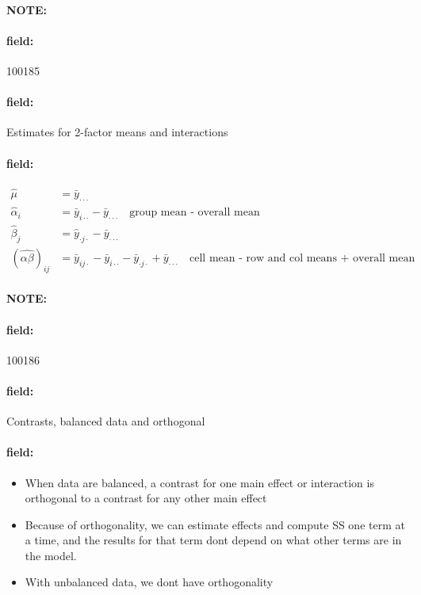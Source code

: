 \documentclass[12pt]{article}
\newenvironment{note}{\paragraph{NOTE:}}{}
\newenvironment{field}{\paragraph{field:}}{}
\begin{document}
\begin{note}
    \begin{field}
        \tiny 100185
    \end{field}
    \begin{field}
        Estimates for 2-factor means and interactions
    \end{field}
    \begin{field}
        \begin{align*}
          \hat{\mu} &= \bar{y}_{\cdot\cdot\cdot}\\
          \hat{\alpha}_i &= \bar{y}_{i\cdot\cdot} - \bar{y}_{\cdot\cdot\cdot} \quad \text{group mean - overall mean}\\
          \hat{\beta}_j &= \hat{y}_{\cdot j \cdot } - \bar{y}_{\cdot \cdot \cdot }\\
          (\hat{\alpha\beta})_{ij} &= \bar{y}_{ij\cdot} - \bar{y}_{i\cdot\cdot} - \bar{y}_{\cdot j \cdot } + \bar{y}_{\cdot\cdot\cdot } \quad \text{cell mean - row and col means + overall mean }
        \end{align*}
    \end{field}
\end{note}


\begin{note}
    \begin{field}
        \tiny 100186
    \end{field}
    \begin{field}
        Contrasts, balanced data and orthogonal
    \end{field}
    \begin{field}
        \begin{itemize}
          \item When data are balanced, a contrast for one main effect or interaction is orthogonal to a contrast for any other main effect
          \item Because of orthogonality, we can estimate effects and compute SS one term at a time, and the results for that term dont depend on what other terms are in the model.
          \item With unbalanced data, we dont have orthogonality
        \end{itemize}
    \end{field}
\end{note}
\end{document}
